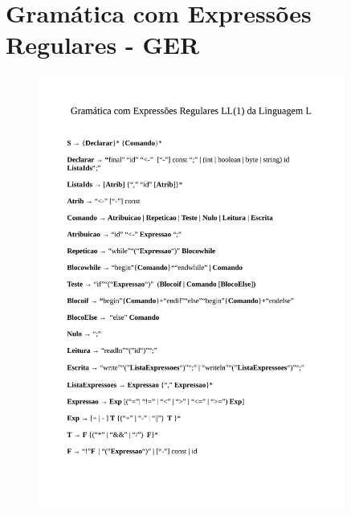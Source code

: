 \section{\esp Gramática com Expressões Regulares - GER}   
\begin{figure}[!ht]
	\vspace{0.2cm}
	\includegraphics[width=0.9\textwidth]{figuras/GER_LL1-1.png}
	 \vspace{0.2cm}
	\label{fig:figura1}
\end{figure}
\vspace{0.2cm}